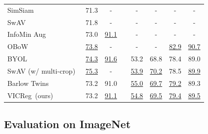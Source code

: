 \documentclass{article} %
\newcommand{\algo}{VICReg}
\begin{document}
\begin{table}[t]
\begin{tabular}{ @{} l cc c cccc @{} }
	    SimSiam~\cite{chen2020simsiam}          & 71.3 & -      && -      & -      & -      & - \\
	    SwAV~\cite{caron2020swav}               & 71.8 & -      && - & - & - & - \\
	    InfoMin Aug~\cite{tian2020makes}        & 73.0 & \underline{91.1}   && -      & -      & -      & - \\
	    OBoW \cite{gidaris2021obow}             & \underline{73.8} & -         && -    & -    & \underline{82.9} & \underline{90.7} \\
	    BYOL~\cite{grill2020byol}               & \underline{74.3} & \underline{91.6}   && 53.2 & 68.8 & 78.4 & 89.0 \\
	    SwAV (w/ multi-crop)~\cite{caron2020swav}               & \underline{75.3} & -      && \underline{53.9} & \underline{70.2} & 78.5 & \underline{89.9} \\
	    Barlow Twins~\cite{zbontar2021barlow}   & 73.2 & 91.0 && \underline{55.0} & \underline{69.7} & \underline{79.2} & 89.3 \\
	    \algo \ (ours)                          & 73.2 & \underline{91.1} && \underline{54.8} & \underline{69.5} & \underline{79.4} & \underline{89.5} \\
      \bottomrule
    \end{tabular}
\end{table}

\subsection{Evaluation on ImageNet} \label{sec:eval_imagenet}
\end{document}
